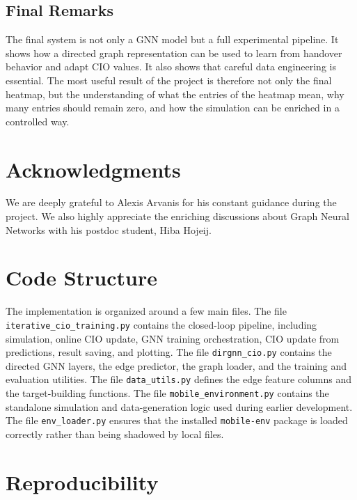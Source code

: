 \documentclass[11pt, a4paper, twoside]{article}
\begin{document}
\subsection{Final Remarks}

The final system is not only a GNN model but a full experimental pipeline. It shows how a directed graph representation can be used to learn from handover behavior and adapt CIO values. It also shows that careful data engineering is essential. The most useful result of the project is therefore not only the final heatmap, but the understanding of what the entries of the heatmap mean, why many entries should remain zero, and how the simulation can be enriched in a controlled way.

\newpage

\section*{Acknowledgments}

We are deeply grateful to Alexis Arvanis for his constant guidance during the project. We also highly appreciate the enriching discussions about Graph Neural Networks with his postdoc student, Hiba Hojeij.

\newpage

\appendix

\section{Code Structure}
\label{appendix:code}

The implementation is organized around a few main files. The file \texttt{iterative\_cio\_training.py} contains the closed-loop pipeline, including simulation, online CIO update, GNN training orchestration, CIO update from predictions, result saving, and plotting. The file \texttt{dirgnn\_cio.py} contains the directed GNN layers, the edge predictor, the graph loader, and the training and evaluation utilities. The file \texttt{data\_utils.py} defines the edge feature columns and the target-building functions. The file \texttt{mobile\_environment.py} contains the standalone simulation and data-generation logic used during earlier development. The file \texttt{env\_loader.py} ensures that the installed \texttt{mobile-env} package is loaded correctly rather than being shadowed by local files.

\section{Reproducibility}
\label{appendix:reproducibility}
\end{document}
